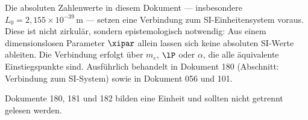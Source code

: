 \begin{foundation}
Die absoluten Zahlenwerte in diesem Dokument — insbesondere $L_0 = 2{,}155 \times 10^{-39}\,\text{m}$ — setzen eine Verbindung zum SI-Einheitensystem voraus. Diese ist nicht zirkulär, sondern epistemologisch notwendig: Aus einem dimensionslosen Parameter $\xipar$ allein lassen sich keine absoluten SI-Werte ableiten. Die Verbindung erfolgt über $m_e$, $\lP$ oder $\alpha$, die alle äquivalente Einstiegspunkte sind. Ausführlich behandelt in Dokument 180 (Abschnitt: Verbindung zum SI-System) sowie in Dokument 056 und 101.

Dokumente 180, 181 und 182 bilden eine Einheit und sollten nicht getrennt gelesen werden.
\end{foundation}


